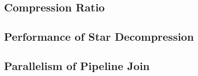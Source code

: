 \subsection{Compression Ratio}\label{sec:experiments_compress}
\subsection{Performance of Star Decompression}
\subsection{Parallelism of Pipeline Join}

